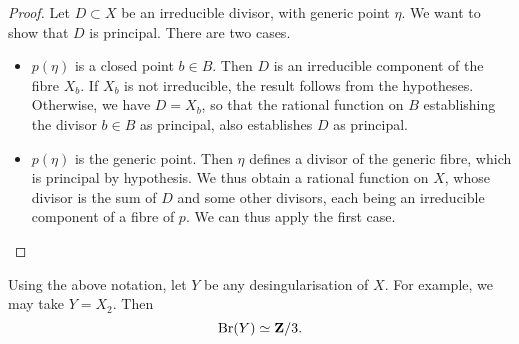 \begin{proof}
    Let $D \subset X$ be an irreducible divisor, with generic point $\eta$. 
    We want to show that $D$ is principal.
    There are two cases.
    \begin{itemize}
        \item
            $p(\eta)$ is a closed point $b \in B$. Then $D$ is an irreducible component of the fibre $X_b$.
            If $X_b$ is not irreducible, the result follows from the hypotheses.
            Otherwise, we have $D = X_b$, 
            so that the rational function on $B$ establishing the divisor $b \in B$ as principal,
            also establishes $D$ as principal.
        \item
            $p(\eta)$ is the generic point.
            Then $\eta$ defines a divisor of the generic fibre, which is principal by hypothesis.
            We thus obtain a rational function on $X$,
            whose divisor is the sum of $D$ and some other divisors, 
            each being an irreducible component of a fibre of $p$.
            We can thus apply the first case. \qedhere
    \end{itemize}
\end{proof}

\begin{theorem} \label{thm-6-brauer-compute}
    Using the above notation, let $Y$ be any desingularisation of $X$.
    For example, we may take $Y = X_2$. Then
    \[ \Br(Y) \simeq \bbZ / 3. \]
\end{theorem}

